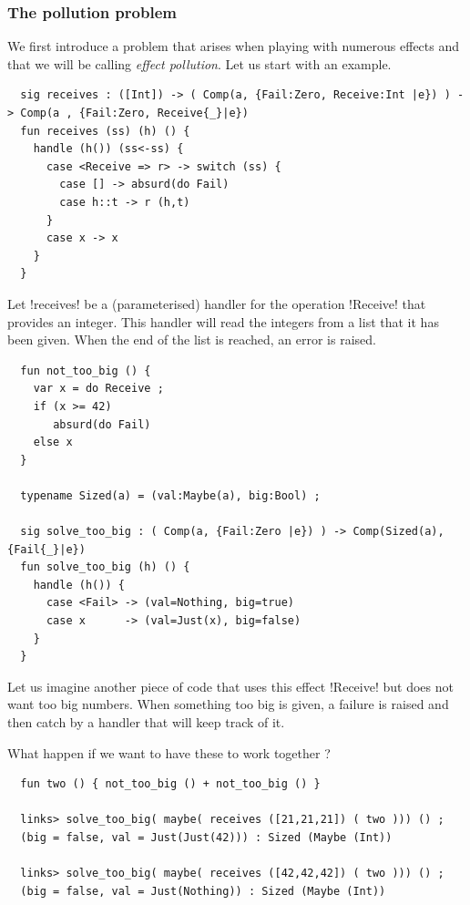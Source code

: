 \documentclass[11pt, nonacm=true, language=french, language=english]{acmart}
\begin{document}
\subsubsection{The pollution problem}
\label{sec:pollution-problem}

We first introduce a problem that arises when playing with numerous effects and that we will be calling \emph{effect pollution}. Let us start with an example.

\begin{lstlisting}
  sig receives : ([Int]) -> ( Comp(a, {Fail:Zero, Receive:Int |e}) ) -> Comp(a , {Fail:Zero, Receive{_}|e})
  fun receives (ss) (h) () {
    handle (h()) (ss<-ss) {
      case <Receive => r> -> switch (ss) {
        case [] -> absurd(do Fail)
        case h::t -> r (h,t)
      }
      case x -> x
    }
  }
\end{lstlisting}

Let !receives! be a (parameterised) handler for the operation !Receive! that provides an integer. This handler will read the integers from a list that it has been given. When the end of the list is reached, an error is raised.

\begin{lstlisting}
  fun not_too_big () {
    var x = do Receive ;
    if (x >= 42)
       absurd(do Fail)
    else x
  }

  typename Sized(a) = (val:Maybe(a), big:Bool) ;

  sig solve_too_big : ( Comp(a, {Fail:Zero |e}) ) -> Comp(Sized(a), {Fail{_}|e})
  fun solve_too_big (h) () {
    handle (h()) {
      case <Fail> -> (val=Nothing, big=true)
      case x      -> (val=Just(x), big=false)
    }
  }
\end{lstlisting}

Let us imagine another piece of code that uses this effect !Receive! but does not want too big numbers. When something too big is given, a failure is raised and then catch by a handler that will keep track of it.

What happen if we want to have these to work together ?

\begin{lstlisting}
  fun two () { not_too_big () + not_too_big () }

  links> solve_too_big( maybe( receives ([21,21,21]) ( two ))) () ;
  (big = false, val = Just(Just(42))) : Sized (Maybe (Int))

  links> solve_too_big( maybe( receives ([42,42,42]) ( two ))) () ;
  (big = false, val = Just(Nothing)) : Sized (Maybe (Int))
\end{lstlisting}
\end{document}
